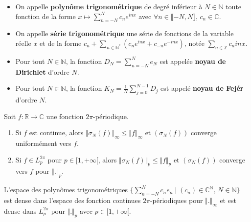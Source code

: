 	\begin{definition}
		\begin{itemize}
			\item On appelle \textbf{polynôme trigonométrique} de degré inférieur à $N \in \mathbb{N}$ toute fonction de la forme $x \mapsto \sum_{n=-N}^{N} c_n e^{inx}$ avec $\forall n \in \llbracket -N, N \rrbracket$, $c_n \in \mathbb{C}$.
			\item On appelle \textbf{série trigonométrique} une série de fonctions de la variable réelle $x$ et de la forme $c_n + \sum_{n \in \mathbb{N}^*} (c_n e^{inx} + c_{-n} e^{-inx})$, notée $\sum_{n \in \mathbb{Z}} c_n {inx}$.
		\end{itemize}
	\end{definition}
	
	
	\begin{example}
		\begin{itemize}
			\item Pour tout $N \in \mathbb{N}$, la fonction $D_N = \sum_{n=-N}^{N} e_N$ est appelée \textbf{noyau de Dirichlet} d'ordre $N$.
			\item Pour tout $N \in \mathbb{N}$, la fonction $K_N = \frac{1}{N} \sum_{j=0}^{N-1} D_j$ est appelé \textbf{noyau de Fejér} d'ordre $N$.
		\end{itemize}
	\end{example}
	
	
	\begin{theorem}[Fejér]
		Soit $f : \mathbb{R} \rightarrow \mathbb{C}$ une fonction $2\pi$-périodique.
		\begin{enumerate}[label=(\roman*)]
			\item Si $f$ est continue, alors $\Vert \sigma_N(f) \Vert_\infty \leq \Vert f \Vert_\infty$ et $(\sigma_N(f))$ converge uniformément vers $f$.
			\item Si $f \in L_p^{2\pi}$ pour $p \in [1,+\infty[$, alors $\Vert \sigma_N(f) \Vert_p \leq \Vert f \Vert_p$ et $(\sigma_N(f))$ converge vers $f$ pour $\Vert . \Vert_p$.
		\end{enumerate}
	\end{theorem}
	
	\begin{corollary}
		L'espace des polynômes trigonométriques $\{ \sum_{n=-N}^N c_n e_n \mid (c_n) \in \mathbb{C}^{\mathbb{N}}, \, N \in \mathbb{N} \}$ est dense dans l'espace des fonction continues $2\pi$-périodiques pour $\Vert . \Vert_\infty$ et est dense dans $L_p^{2\pi}$ pour $\Vert . \Vert_p$ avec $p \in [1,+\infty[$.
	\end{corollary}
	
